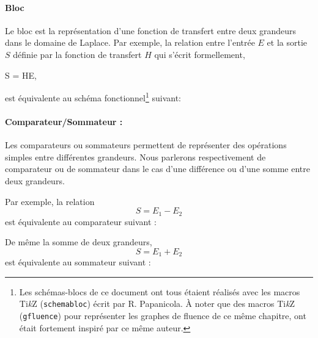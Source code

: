 \paragraph{Bloc}
Le bloc est la représentation d'une fonction de transfert entre deux 
grandeurs dans le domaine de Laplace. Par exemple, la relation entre l'entrée 
$E$ et la sortie $S$ définie par la fonction de transfert $H$ qui s'écrit 
formellement, 
\begin{bequation}
S = HE,\label{eq-ES}
\end{bequation}
est équivalente au schéma fonctionnel\footnote{Les schémas-blocs de ce document
ont tous étaient réalisés avec les macros Ti\emph{k}Z (\verb?schemabloc?) 
écrit par R. Papanicola\cite{schemabloc}. \`A noter que des macros 
Ti\emph{k}Z (\verb?gfluence?) pour représenter les graphes de fluence 
de ce même chapitre, ont était fortement inspiré par ce même auteur.} 
suivant:
\begin{center}

\end{center}
\paragraph{Comparateur/Sommateur :}
Les comparateurs ou sommateurs permettent de représenter des opérations 
simples entre différentes grandeurs.
Nous parlerons respectivement de comparateur ou de sommateur dans le cas 
d'une différence ou d'une somme entre deux grandeurs. 

Par exemple, la relation 
\[
S = E_1-E_2 
\]
est équivalente au comparateur suivant :
\begin{center}

\end{center}
De même la somme de deux grandeurs,
\[
S = E_1+E_2
\]
est équivalente au sommateur suivant :
\begin{center}

\end{center}
